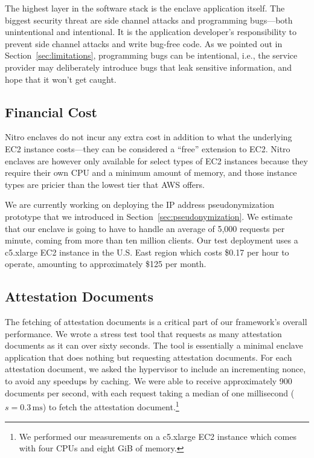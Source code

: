 The highest layer in the software stack is the enclave application itself.  The
biggest security threat are side channel attacks and programming bugs---both
unintentional and intentional.  It is the application developer's responsibility
to prevent side channel attacks and write bug-free code.  As we pointed out in
Section~\ref{sec:limitations}, programming bugs can be intentional, i.e., the
service provider may deliberately introduce bugs that leak sensitive
information, and hope that it won't get caught.

\subsection{Financial Cost}
\label{sec:cost}

Nitro enclaves do not incur any extra cost in addition to what the underlying
EC2 instance costs---they can be considered a ``free'' extension to EC2.  Nitro
enclaves are however only available for select types of EC2 instances because
they require their own CPU and a minimum amount of memory, and those instance
types are pricier than the lowest tier that AWS offers.


We are currently working on deploying the IP address pseudonymization prototype
that we introduced in Section~\ref{sec:pseudonymization}.  We estimate that our
enclave is going to have to handle an average of 5,000 requests per minute,
coming from more than ten million clients.  Our test deployment uses a c5.xlarge
EC2 instance in the U.S. East region which costs \$0.17 per hour to operate,
amounting to approximately \$125 per month.

\subsection{Attestation Documents}
\label{sec:attestation-performance}

The fetching of attestation documents is a critical part of our framework's
overall performance.  We wrote a stress test tool that requests as many
attestation documents as it can over sixty seconds.  The tool is essentially a
minimal enclave application that does nothing but requesting attestation
documents.  For each attestation document, we asked the hypervisor to include
an incrementing nonce, to avoid any speedups by caching.  We were able to
receive approximately 900 documents per second, with each request taking a
median of one millisecond ($s = 0.3\,\text{ms}$) to fetch the attestation
document.\footnote{We performed our measurements on a c5.xlarge EC2 instance
which comes with four CPUs and eight GiB of memory.}

